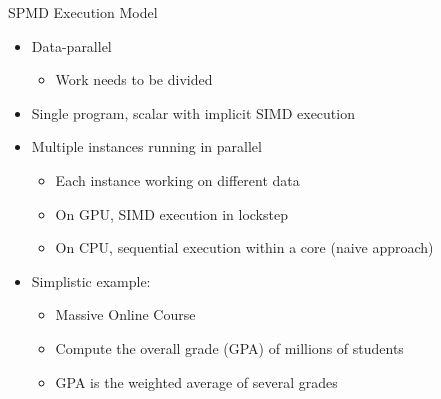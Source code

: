 

\begin{frame}{SPMD Execution Model}

\begin{itemize}
    \item Data-parallel
    \begin{itemize}
        \item Work needs to be divided
    \end{itemize}
    
    \item Single program, scalar with implicit SIMD execution
    
    \item Multiple instances running in parallel
    \begin{itemize}
        \item Each instance working on different data
        \item On GPU, SIMD execution in lockstep
        \item On CPU, sequential execution within a core (naive approach)
    \end{itemize}
\end{itemize}

\begin{itemize}
    \item Simplistic example:
    \begin{itemize}
        \item Massive Online Course
        \item Compute the overall grade (GPA) of millions of students
        \item GPA is the weighted average of several grades
    \end{itemize}
\end{itemize}

\end{frame}



